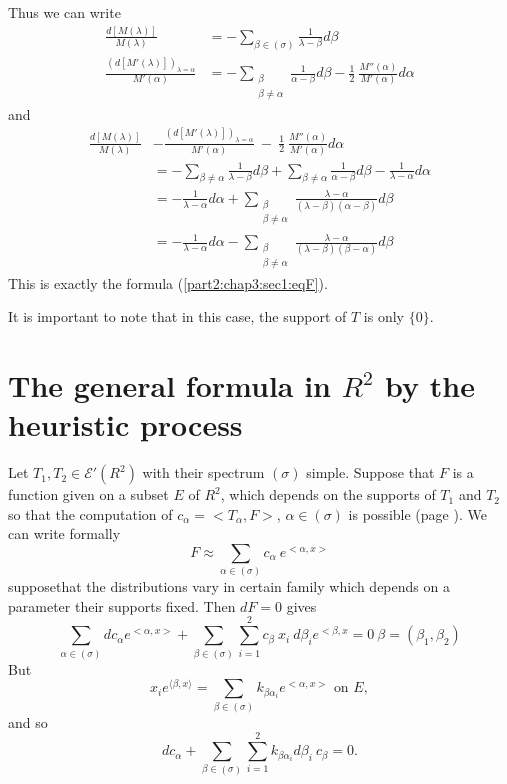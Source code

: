 Thus we can write
\begin{align*}
  \frac{d [ M (\lambda )]}{M (\lambda )} &= - \sum_{\beta \in (\sigma
    )} \frac{1}{\lambda - \beta} d \beta \\ 
  \frac{(d [ M' (\lambda )])_{\lambda = \alpha}}{M' (\alpha )} & = -
  \sum_{\substack{\beta \\ \beta \neq \alpha}} \frac{1}{\alpha -
    \beta} d \beta - \frac{1}{2} ~ \frac{M'' (\alpha )}{M' (\alpha )}
  d \alpha 
\end{align*}
and\pageoriginale
\begin{align*}
\frac{d [M(\lambda )]}{M(\lambda )} & - \frac{(d [M' (\lambda
    )])_{\lambda = \alpha}}{M' (\alpha )}~  - ~ \frac{1}{2} ~
\frac{M'' (\alpha )}{M' (\alpha )} d \alpha \\
  &= - \sum_{\beta \neq \alpha} \frac{1}{\lambda - \beta} d \beta  +
  \sum_{\beta \neq \alpha} \frac{1}{\alpha - \beta} d \beta -
  \frac{1}{\lambda - \alpha} d \alpha \\ 
  &= - \frac{1}{\lambda - \alpha} d \alpha + \sum_{\substack{\beta
      \\ \beta \neq \alpha}} \frac{\lambda - \alpha}{(\lambda - \beta
    ) (\alpha - \beta )} d \beta \\ 
  &= - \frac{1}{\lambda - \alpha} d \alpha - \sum_{\substack{\beta
      \\ \beta \neq \alpha}} \frac{\lambda - \alpha}{(\lambda - \beta ) (\beta -
    \alpha )} d \beta 
\end{align*} 
This is exactly the formula (\ref{part2:chap3:sec1:eqF}).

\begin{remark*}
  It is important to note that in this case, the support of $T$ is
  only $\{ 0 \}$. 
\end{remark*}

\section{The general formula in $R^2$ by the heuristic
  process}\label{part2:chap3:sec3} %

Let $T_1, T_2 \in \mathscr{E}' (R^2)$ with their spectrum $(\sigma)$
simple. Suppose that $F$ is a function given on a subset $E$ of $R^2$,
which depends on the supports of $T_1$ and $T_2$ so that the
computation of $c_\alpha = < T_\alpha,  F >$, $\alpha \in (\sigma)$ is
possible (page \pageref{page79}). We can write formally 
$$
F \approx \sum_{\alpha \in (\sigma )} c_\alpha ~ e^{< \alpha,  x >}
$$
suppose\pageoriginale that the distributions vary in certain family
which depends on 
a parameter their supports fixed. Then $dF = 0$ gives 
$$
\sum_{\alpha \in (\sigma )} dc_\alpha e^{< \alpha,  x > } +
\sum_{\beta \in (\sigma )} \sum_{i=1}^{2} c_\beta ~ x_i ~ d \beta_i
e^{<\beta,  x} = 0 ~\beta = (\beta_1, \beta_2) 
$$
But
$$
x_i e^{\langle \beta,  x \rangle} = \sum_{\beta \in (\sigma)} k_{\beta
  \alpha_i} e^{<\alpha,  x>} \text{ on } E, 
$$
and so 
$$
dc_\alpha + \sum_{\beta \in (\sigma)} \sum_{i=1}^2 k_{\beta \alpha_i}
d \beta_i ~ c_\beta = 0. 
$$

